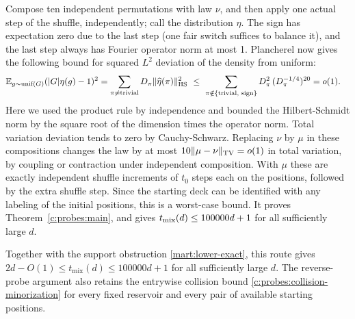 \label{c:probes:bound}
Compose ten independent permutations with law \(\nu\), and then apply one actual step of the
shuffle, independently; call the distribution \(\eta\). The sign has expectation zero due to
the last step (one fair switch suffices to balance it), and the last step always has Fourier
operator norm at most 1. Plancherel now gives the following bound for squared \(L^2\) deviation
of the density from uniform:
\[
\begin{aligned}
\mathbb E_{g\sim \text{unif}(G)} (|G|\eta(g)-1)^2
 &= \sum_{\pi\ne \text{trivial}} D_\pi \|\widehat\eta(\pi)\|_{\rm HS}^2
 \ \le\ \sum_{\pi\notin\{\text{trivial, sign}\}} D_\pi^2\,(D_\pi^{-1/4})^{20}=o(1).
\end{aligned}
\]
Here we used the product rule by independence and bounded the Hilbert-Schmidt norm by the
square root of the dimension times the operator norm. Total variation deviation tends to zero
by Cauchy-Schwarz. Replacing \(\nu\) by \(\mu\) in these compositions changes the law by at
most \(10\|\mu-\nu\|_{\rm TV}=o(1)\) in total variation, by coupling or contraction under
independent composition. With \(\mu\) these are exactly independent shuffle increments of
\(t_0\) steps each on the positions, followed by the extra shuffle step. Since the starting
deck can be identified with any labeling of the initial positions, this is a worst-case bound.
It proves Theorem~\ref{c:probes:main}, and gives \(t_{\rm mix}(d)\le100000d+1\) for all
sufficiently large \(d\).

\label{c:probes:p030}

Together with the support obstruction \eqref{mart:lower-exact}, this
route gives $2d-O(1)\le t_{\mathrm{mix}}(d)\le100000d+1$ for all
sufficiently large $d$. The reverse-probe argument also retains the
entrywise collision bound \eqref{c:probes:collision-minorization} for
every fixed reservoir and every pair of available starting positions.
